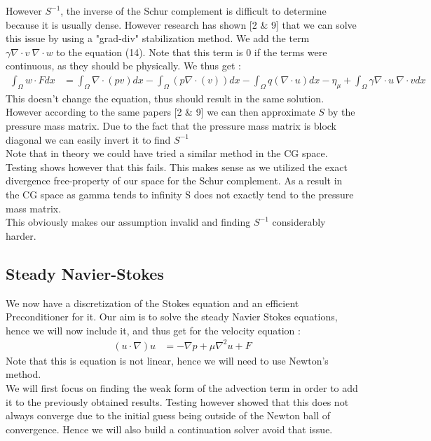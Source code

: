\documentclass[11pt,twoside,a4paper]{article}
\begin{document}
 However $S^{-1}$, the inverse of the Schur complement is difficult to determine because it is usually dense. However research has shown [2 \& 9] that we can solve this issue by using a "grad-div" stabilization method. We add the term $\gamma \nabla \cdot v \: \nabla \cdot w$ to the equation (14). Note that this term is 0 if the terms were continuous, as they should be physically. We thus get :
\begin{align}
\int_\Omega w \cdot F dx &= \int_\Omega \nabla \cdot (p v) dx - \int_\Omega ( p \nabla \cdot (v)) dx - \int_\Omega q (\nabla \cdot u) dx  - \eta_\mu + \int_\Omega \gamma \nabla \cdot u \: \nabla \cdot v dx
\end{align}
This doesn't change the equation, thus should result in the same solution. However according to the same papers [2 \& 9] we can then approximate $S$ by the pressure mass matrix. Due to the fact that the pressure mass matrix is block diagonal we can easily invert it to find $S^{-1}$
\\
Note that in theory we could have tried a similar method in the CG space.
Testing shows however that this fails.
This makes sense as we utilized the exact divergence free-property of our space for the Schur complement.
As a result in the CG space as gamma tends to infinity S does not exactly tend to the pressure mass matrix.\\
This obviously makes our assumption invalid and finding $S^{-1}$ considerably harder.

\subsection{Steady Navier-Stokes}
We now have a discretization of the Stokes equation and an efficient Preconditioner for it.
Our aim is to solve the steady Navier Stokes equations, hence we will now include it, and thus get for the velocity equation :
\begin{align*}
(u \cdot \nabla) u &= -\nabla p + \mu \nabla^2 u + F
\end{align*}
Note that this is equation is not linear, hence we will need to use Newton's method.\\
We will first focus on finding the weak form of the advection term in order to add it to the previously obtained results. Testing however showed that this does not always converge due to the initial guess being outside of the Newton ball of convergence. Hence we will also build a continuation solver avoid that issue.
\end{document}
